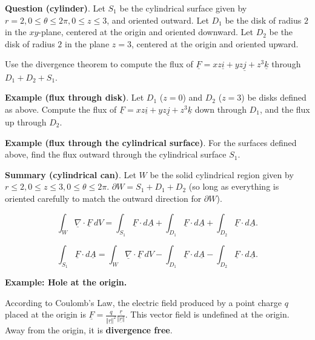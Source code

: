 \documentclass[12pt,letterpaper,noanswers]{exam}
\newcommand{\mb}[1]{\underline{#1}}
\begin{document}
\noindent\textbf{Question (cylinder)}.  Let $S_1$ be the cylindrical surface given by $r = 2, 0\leq \theta\leq 2\pi, 0\leq z\leq 3$, and oriented outward.  Let $D_1$ be the disk of radius $2$ in the $xy$-plane, centered at the origin and oriented downward.  Let $D_2$ be the disk of radius $2$ in the plane $z=3$, centered at the origin and oriented upward.  

Use the divergence theorem to compute the flux of $\mb F = xz\mb i + yz\mb j + z^3\mb k$ through $D_1+D_2+S_1$.

\vspace{2in}


\noindent\textbf{Example (flux through disk)}.  Let $D_1$ ($z=0$) and $D_2$ ($z=3$) be disks defined as above.  Compute the flux of $\mb F = xz\mb i + yz\mb j + z^3\mb k$ down through $D_1$, and the flux up through $D_2$.  

\vspace{2in}


\noindent\textbf{Example (flux through the cylindrical surface)}.  For the surfaces defined above, find the flux outward through the cylindrical surface $S_1$.
\vspace{1.5in}



\noindent\textbf{Summary (cylindrical can)}.  Let $W$ be the solid cylindrical region given by $r\leq 2, 0\leq z\leq 3, 0\leq \theta\leq 2\pi$.  $\partial W = S_1+D_1+D_2$ (so long as everything is oriented carefully to match the outward direction for $\partial W$).

\[\displaystyle \int_W \mb\nabla\cdot\mb F\ dV = \int_{S_1}\mb F\cdot d\mb A + \int_{D_1}\mb F\cdot d\mb A + \int_{D_2}\mb F\cdot d\mb A.\]

\[\displaystyle  \int_{S_1}\mb F\cdot d\mb A = \int_W \mb\nabla\cdot\mb F\ dV - \int_{D_1}\mb F\cdot d\mb A - \int_{D_2}\mb F\cdot d\mb A.\]


\vspace{0.5cm}


\noindent\textbf{Example: Hole at the origin.} 

According to Coulomb's Law, the electric field produced by a point charge $q$ placed at the origin is $\displaystyle \mb F = \frac{q}{\Vert \mb r\Vert^2}\frac{\mb r}{\Vert \mb r\Vert}$.  This vector field is undefined at the origin.  Away from the origin, it is \textbf{divergence free}.
\end{document}
